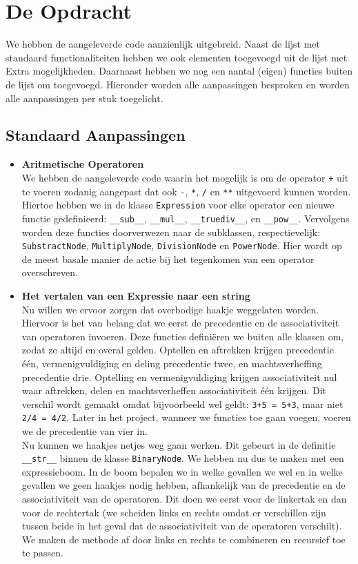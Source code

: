 \documentclass[12pt]{article}
\begin{document}
\section{De Opdracht}
We hebben de aangeleverde code aanzienlijk uitgebreid. Naast de lijst met standaard functionaliteiten hebben we ook elementen toegevoegd uit de lijst met Extra mogelijkheden. Daarnaast hebben we nog een aantal (eigen) functies buiten de lijst om toegevoegd. Hieronder worden alle aanpassingen besproken en worden alle aanpassingen per stuk toegelicht.

\subsection*{Standaard Aanpassingen}
\begin{itemize}
\item \textbf{Aritmetische Operatoren} \\
We hebben de aangeleverde code waarin het mogelijk is om de operator \texttt{+} uit te voeren zodanig aangepast dat ook \texttt{-}, \texttt{*}, \texttt{/} en \texttt{**} uitgevoerd kunnen worden. Hiertoe hebben we in de klasse \texttt{Expression} voor elke operator een nieuwe functie gedefinieerd: \texttt{\_\_sub\_\_}, \texttt{\_\_mul\_\_}, \texttt{\_\_truediv\_\_}, en \texttt{\_\_pow\_\_}. Vervolgens worden deze functies doorverwezen naar de subklassen, respectievelijk: \texttt{SubstractNode}, \texttt{MultiplyNode}, \texttt{DivisionNode} en \texttt{PowerNode}. Hier wordt op de meest basale manier de actie bij het tegenkomen van een operator overschreven.


\item \textbf{Het vertalen van een Expressie naar een string} \\
Nu willen we ervoor zorgen dat overbodige haakje weggelaten worden. Hiervoor is het van belang dat we eerst de precedentie en de associativiteit  van operatoren invoeren. Deze functies defini\"eren we buiten alle klassen om, zodat ze altijd en overal gelden. Optellen en aftrekken krijgen precedentie \'e\'en, vermenigvuldiging en deling precedentie twee, en machtsverheffing precedentie drie. Optelling en vermenigvuldiging krijgen associativiteit  nul waar aftrekken, delen en machtsverheffen associativiteit \'e\'en krijgen. Dit verschil wordt gemaakt omdat bijvoorbeeld wel geldt: \texttt{3+5 = 5+3}, maar niet \texttt{2/4 = 4/2}. Later in het project, wanneer we functies toe gaan voegen, voeren we de precedentie van vier in.  \\ \newline
Nu kunnen we haakjes netjes weg gaan werken. Dit gebeurt in de definitie \texttt{\_\_str\_\_} binnen de klasse \texttt{BinaryNode}.  We hebben nu dus te maken met een expressieboom. In de boom bepalen we in welke gevallen we wel en in welke gevallen we geen haakjes nodig hebben, afhankelijk van de precedentie en  de associativiteit van de operatoren. Dit doen we eerst voor de linkertak en dan voor de rechtertak (we scheiden links en rechts omdat er verschillen zijn tussen beide in het geval dat de associativiteit van de operatoren verschilt). We maken de methode af door links en rechts te combineren en recursief toe te passen.
\end{itemize}
\end{document}
